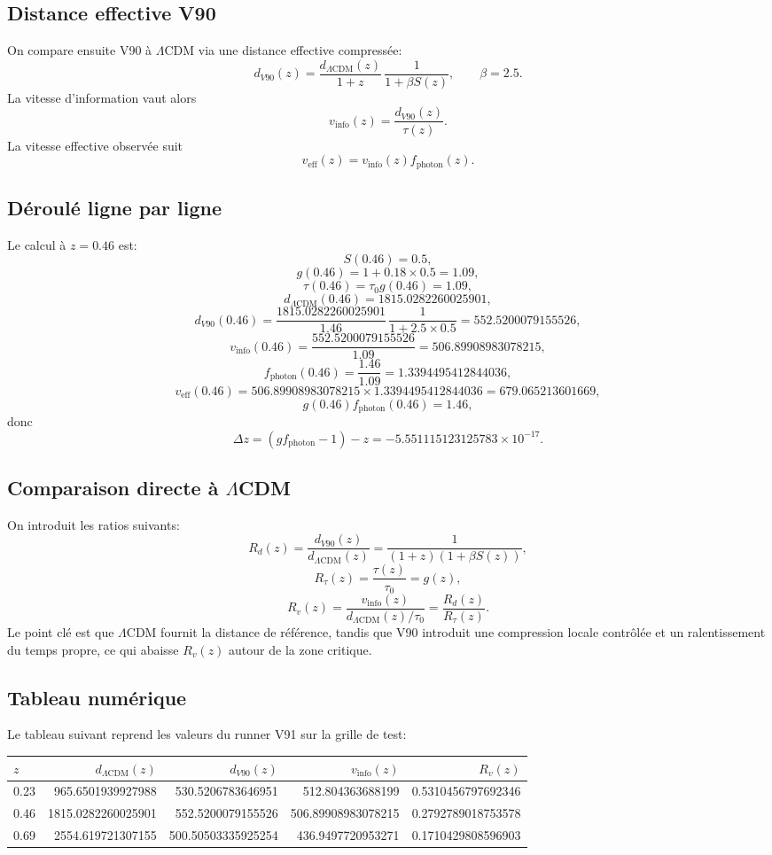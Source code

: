 \subsection{Distance effective V90}
On compare ensuite V90 à $\Lambda$CDM via une distance effective compressée:
\[
d_{V90}(z)=\frac{d_{\Lambda\mathrm{CDM}}(z)}{1+z}\,\frac{1}{1+\beta S(z)},
\qquad \beta=2.5.
\]
La vitesse d'information vaut alors
\[
v_{\mathrm{info}}(z)=\frac{d_{V90}(z)}{\tau(z)}.
\]
La vitesse effective observée suit
\[
v_{\mathrm{eff}}(z)=v_{\mathrm{info}}(z)f_{\mathrm{photon}}(z).
\]

\subsection{Déroulé ligne par ligne}
Le calcul à $z=0.46$ est:
\[
S(0.46)=0.5,
\]
\[
g(0.46)=1+0.18\times 0.5=1.09,
\]
\[
\tau(0.46)=\tau_0 g(0.46)=1.09,
\]
\[
d_{\Lambda\mathrm{CDM}}(0.46)=1815.0282260025901,
\]
\[
d_{V90}(0.46)=\frac{1815.0282260025901}{1.46}\,\frac{1}{1+2.5\times 0.5}=552.5200079155526,
\]
\[
v_{\mathrm{info}}(0.46)=\frac{552.5200079155526}{1.09}=506.89908983078215,
\]
\[
f_{\mathrm{photon}}(0.46)=\frac{1.46}{1.09}=1.3394495412844036,
\]
\[
v_{\mathrm{eff}}(0.46)=506.89908983078215\times 1.3394495412844036=679.065213601669,
\]
\[
g(0.46)f_{\mathrm{photon}}(0.46)=1.46,
\]
donc
\[
\Delta z=(g f_{\mathrm{photon}}-1)-z=-5.551115123125783\times 10^{-17}.
\]

\subsection{Comparaison directe à $\Lambda$CDM}
On introduit les ratios suivants:
\[
R_d(z)=\frac{d_{V90}(z)}{d_{\Lambda\mathrm{CDM}}(z)}=\frac{1}{(1+z)(1+\beta S(z))},
\]
\[
R_\tau(z)=\frac{\tau(z)}{\tau_0}=g(z),
\]
\[
R_v(z)=\frac{v_{\mathrm{info}}(z)}{d_{\Lambda\mathrm{CDM}}(z)/\tau_0}=\frac{R_d(z)}{R_\tau(z)}.
\]
Le point clé est que $\Lambda$CDM fournit la distance de référence, tandis que V90 introduit une compression locale contrôlée et un ralentissement du temps propre, ce qui abaisse $R_v(z)$ autour de la zone critique.

\subsection{Tableau numérique}
Le tableau suivant reprend les valeurs du runner V91 sur la grille de test:
\begin{center}
\begin{tabular}{lrrrr}
\hline
$z$ & $d_{\Lambda\mathrm{CDM}}(z)$ & $d_{V90}(z)$ & $v_{\mathrm{info}}(z)$ & $R_v(z)$ \\
\hline
0.23 & 965.6501939927988 & 530.5206783646951 & 512.804363688199 & 0.5310456797692346 \\
0.46 & 1815.0282260025901 & 552.5200079155526 & 506.89908983078215 & 0.2792789018753578 \\
0.69 & 2554.619721307155 & 500.50503335925254 & 436.9497720953271 & 0.1710429808596903 \\
\hline
\end{tabular}
\end{center}

